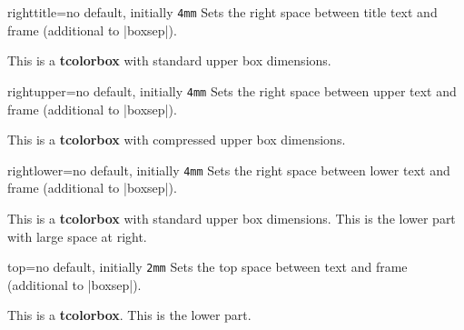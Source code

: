 \begin{docTcbKey}{righttitle}{=}{no default, initially \texttt{4mm}}
  Sets the right space between title text and frame (additional to |boxsep|).
\begin{dispExample}

\begin{tcolorbox}[width=5cm,righttitle=2cm,title=My very long title text]
This is a \textbf{tcolorbox} with standard upper box dimensions.
\end{tcolorbox}
\end{dispExample}
\end{docTcbKey}


\begin{docTcbKey}{rightupper}{=}{no default, initially \texttt{4mm}}
  Sets the right space between upper text and frame (additional to |boxsep|).
\begin{dispExample}

\begin{tcolorbox}[width=5cm,rightupper=2cm,title=My very long title text]
This is a \textbf{tcolorbox} with compressed upper box dimensions.
\end{tcolorbox}
\end{dispExample}
\end{docTcbKey}


\clearpage
\begin{docTcbKey}{rightlower}{=}{no default, initially \texttt{4mm}}
  Sets the right space between lower text and frame (additional to |boxsep|).
\begin{dispExample}

\begin{tcolorbox}[width=5cm,rightlower=2cm]
This is a \textbf{tcolorbox} with standard upper box dimensions.
\tcblower
This is the lower part with large space at right.
\end{tcolorbox}
\end{dispExample}
\end{docTcbKey}



\begin{docTcbKey}{top}{=}{no default, initially \texttt{2mm}}
  Sets the top space between text and frame (additional to |boxsep|).
\begin{dispExample}

\begin{tcolorbox}[top=0mm]
This is a \textbf{tcolorbox}.
\tcblower
This is the lower part.
\end{tcolorbox}
\end{dispExample}
\end{docTcbKey}


